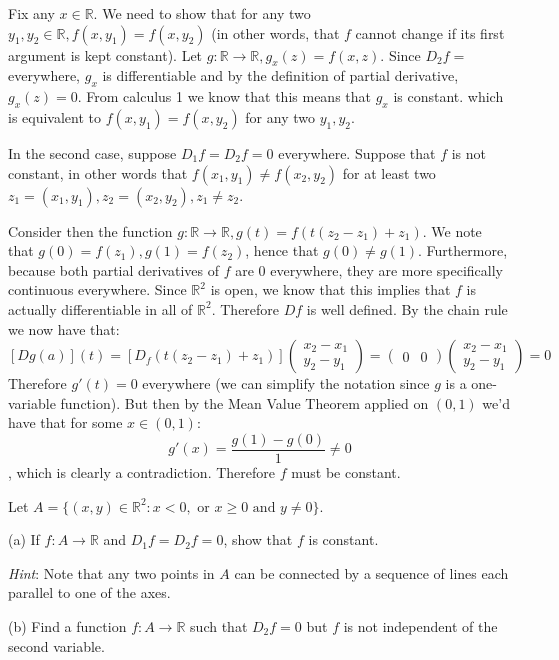 \begin{solution}

    Fix any $x \in \mathbb{R}$. 
    We need to show that for any two $y_1, y_2 \in \mathbb{R}, f(x, y_1) = f(x, y_2)$ (in other words, that $f$ cannot change if its first argument is kept constant).
    Let $g: \mathbb{R} \rightarrow \mathbb{R}, g_x(z) = f(x, z)$.
    Since $D_2 f = $ everywhere, $g_x$ is differentiable and by the definition of partial derivative, $g_x(z) = 0$.
    From calculus 1 we know that this means that $g_x$ is constant. which is equivalent to $f(x, y_1) = f(x, y_2)$ for any two $y_1, y_2$.

    In the second case, suppose $D_1 f = D_2 f = 0$ everywhere.
    Suppose that $f$ is not constant, in other words that $f(x_1, y_1) \neq f(x_2, y_2)$ for at least two $z_1 = (x_1, y_1), z_2 = (x_2, y_2), z_1 \neq z_2$.

    Consider then the function $g: \mathbb{R} \rightarrow \mathbb{R}, g(t) = f(t(z_2 - z_1) + z_1)$. We note that $g(0) = f(z_1), g(1) = f(z_2)$, hence that $g(0) \neq g(1)$. Furthermore, because both partial derivatives of $f$ are 0 everywhere, they are more specifically continuous everywhere. Since $\mathbb{R}^2$ is open, we know that this implies that $f$ is actually differentiable in all of $\mathbb{R}^2$. Therefore $D f$ is well defined. By the chain rule we now have that:
    $$[D g(a)](t) = [D_f(t(z_2 - z_1) + z_1)] \begin{pmatrix}
        x_2 - x_1 \\ y_2 - y_1
    \end{pmatrix} = \begin{pmatrix}
        0 & 0
    \end{pmatrix} \begin{pmatrix}
        x_2 - x_1 \\ y_2 - y_1
    \end{pmatrix} = 0$$
    Therefore $g'(t) = 0$ everywhere (we can simplify the notation since $g$ is a one-variable function). But then by the Mean Value Theorem applied on $(0, 1)$ we'd have that for some $x \in (0, 1)$:
    $$g'(x) = \frac{g(1) - g(0)}{1} \neq 0$$
    , which is clearly a contradiction. Therefore $f$ must be constant.
\end{solution}

\begin{exercise}{23}
    Let $A = \{ (x, y) \in \mathbb{R}^2: x < 0, \text{ or } x \geq 0 \text{ and } y \neq 0\}$.

    (a) If $f: A \rightarrow \mathbb{R}$ and $D_1 f = D_2 f = 0$, show that $f$ is constant.
    
    \textit{Hint}: Note that any two points in $A$ can be connected by a sequence of lines each parallel to one of the axes.

    (b) Find a function $f: A \rightarrow \mathbb{R}$ such that $D_2 f = 0$ but $f$ is not independent of the second variable.
\end{exercise}

